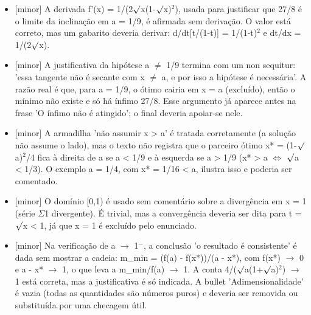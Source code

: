 \documentclass{article}%
\begin{document}
\begin{itemize}%
\item%
{[}minor{]} A derivada f'(x) = 1/(2$\surd$x(1-$\surd$x)$^2$), usada para justificar que 27/8 é o limite da inclinação em a = 1/9, é afirmada sem derivação. O valor está correto, mas um gabarito deveria derivar: d/dt{[}t/(1-t){]} = 1/(1-t)$^2$ e dt/dx = 1/(2$\surd$x).%
\item%
{[}minor{]} A justificativa da hipótese a $\neq$ 1/9 termina com um non sequitur: 'essa tangente não é secante com x $\neq$ a, e por isso a hipótese é necessária'. A razão real é que, para a = 1/9, o ótimo cairia em x = a (excluído), então o mínimo não existe e só há ínfimo 27/8. Esse argumento já aparece antes na frase 'O ínfimo não é atingido'; o final deveria apoiar{-}se nele.%
\item%
{[}minor{]} A armadilha 'não assumir x > a' é tratada corretamente (a solução não assume o lado), mas o texto não registra que o parceiro ótimo x* = (1-$\surd$a)$^2$/4 fica à direita de a se a < 1/9 e à esquerda se a > 1/9 (x* > a $\Leftrightarrow$ $\surd$a < 1/3). O exemplo a = 1/4, com x* = 1/16 < a, ilustra isso e poderia ser comentado.%
\item%
{[}minor{]} O domínio {[}0,1) é usado sem comentário sobre a divergência em x = 1 (série $\Sigma$1 divergente). É trivial, mas a convergência deveria ser dita para t = $\surd$x < 1, já que x = 1 é excluído pelo enunciado.%
\item%
{[}minor{]} Na verificação de a $\to$ 1$^{-}$, a conclusão 'o resultado é consistente' é dada sem mostrar a cadeia: m\_min = (f(a) - f(x*))/(a - x*), com f(x*) $\to$ 0 e a - x* $\to$ 1, o que leva a m\_min/f(a) $\to$ 1. A conta 4/($\surd$a(1+$\surd$a)$^2$) $\to$ 1 está correta, mas a justificativa é só indicada. A bullet 'Adimensionalidade' é vazia (todas as quantidades são números puros) e deveria ser removida ou substituída por uma checagem útil.%
\end{itemize}%
\end{document}
